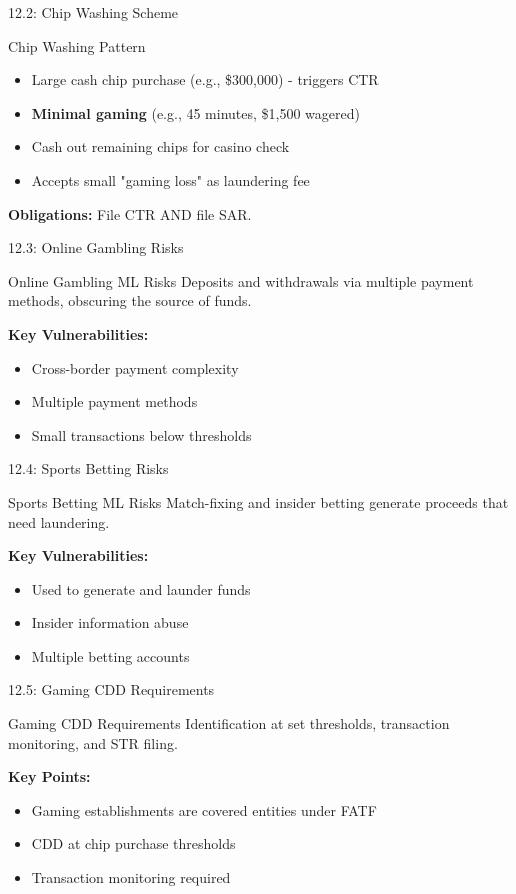 \documentclass{beamer}
\begin{document}
	\begin{frame}{12.2: Chip Washing Scheme}
		\begin{block}{Chip Washing Pattern}
			\begin{itemize}
				\item Large cash chip purchase (e.g., \$300,000) - triggers CTR
				\item \textbf{Minimal gaming} (e.g., 45 minutes, \$1,500 wagered)
				\item Cash out remaining chips for casino check
				\item Accepts small "gaming loss" as laundering fee
			\end{itemize}
		\end{block}
		\textbf{Obligations:} File CTR AND file SAR.
	\end{frame}
	
	\begin{frame}{12.3: Online Gambling Risks}
		\begin{block}{Online Gambling ML Risks}
			Deposits and withdrawals via multiple payment methods, obscuring the source of funds.
		\end{block}
		\textbf{Key Vulnerabilities:}
		\begin{itemize}
			\item Cross-border payment complexity
			\item Multiple payment methods
			\item Small transactions below thresholds
		\end{itemize}
	\end{frame}
	
	\begin{frame}{12.4: Sports Betting Risks}
		\begin{block}{Sports Betting ML Risks}
			Match-fixing and insider betting generate proceeds that need laundering.
		\end{block}
		\textbf{Key Vulnerabilities:}
		\begin{itemize}
			\item Used to generate and launder funds
			\item Insider information abuse
			\item Multiple betting accounts
		\end{itemize}
	\end{frame}
	
	\begin{frame}{12.5: Gaming CDD Requirements}
		\begin{block}{Gaming CDD Requirements}
			Identification at set thresholds, transaction monitoring, and STR filing.
		\end{block}
		\textbf{Key Points:}
		\begin{itemize}
			\item Gaming establishments are covered entities under FATF
			\item CDD at chip purchase thresholds
			\item Transaction monitoring required
		\end{itemize}
	\end{frame}
	
\end{document}
